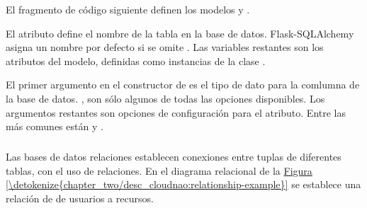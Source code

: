 El fragmento de código siguiente definen los modelos  y .

\begin{sphinxVerbatim}[commandchars=\\\{\}]
 
    
     
      
    
 
    
     
    
\end{sphinxVerbatim}

El atributo   define el nombre de la tabla en la base de datos.
Flask-SQLAlchemy asigna un nombre por defecto si se omite .
Las variables restantes son los atributos del modelo, definidas como instancias
de la clase .

El primer argumento en el constructor de  es el tipo de dato
para la comlumna de la base de datos. , son
sólo algunos de todas las opciones disponibles.
Los argumentos restantes son opciones de configuración para el atributo. Entre
las más comunes están  y  .


\subparagraph{}
\label{\detokenize{chapter_two/desc_cloudnao:relaciones}}
Las bases de datos relaciones establecen conexiones entre tuplas de diferentes
tablas, con el uso de relaciones. En el diagrama relacional de la \hyperref[\detokenize{chapter_two/desc_cloudnao:relationship-example}]{Figura \ref{\detokenize{chapter_two/desc_cloudnao:relationship-example}}}
se establece una relación de  de usuarios a recursos.

